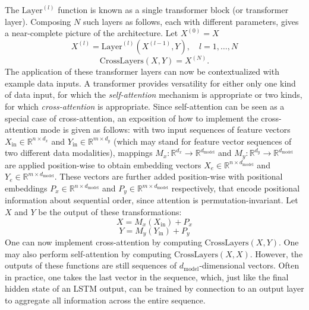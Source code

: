 \documentclass[stu,floatsintext]{apa7}
\begin{document}
The $\text{Layer}^{(l)}$ function is known as a single transformer block (or transformer layer). Composing $N$ such layers as follows, each with different parameters, gives a near-complete picture of the architecture. Let $X^{(0)}=X$
\begin{equation}X^{(l)} = \text{Layer}^{(l)}\left(X^{(l-1)}, Y\right), \quad l = 1, \dots, N\end{equation}
\begin{equation}\text{CrossLayers}(X,Y) = X^{(N)}.\end{equation}
The application of these transformer layers can now be contextualized with example data inputs. A transformer provides versatility for either only one kind of data input, for which the \textit{self-attention} mechanism is appropriate or two kinds, for which \textit{cross-attention} is appropriate. Since self-attention can be seen as a special case of cross-attention, an exposition of how to implement the cross-attention mode is given as follows: with two input sequences of feature vectors $X_{\text{in}}\in\mathbb R^{n\times d_x}$ and $Y_{\text{in}}\in\mathbb R^{m\times d_y}$ (which may stand for feature vector sequences of two different data modalities), mappings $M_x:\mathbb R^{d_x}\to\mathbb R^{d_{\text{model}}}$ and $M_y:\mathbb R^{d_y}\to\mathbb R^{d_{\text{model}}}$ are applied position-wise to obtain embedding vectors $X_e \in \mathbb{R}^{n\times d_{\text{model}}}$ and $Y_e\in\mathbb R^{m\times d_{\text{model}}}$. These vectors are further added position-wise with positional embeddings $P_x \in \mathbb{R}^{n\times d_{\text{model}}}$ and $P_y\in\mathbb R^{m\times d_{\text{model}}}$ respectively, that encode positional information about sequential order, since attention is permutation-invariant. Let $X$ and $Y$ be the output of these transformations:
\begin{equation}X=M_x(X_{\text{in}})+P_x\end{equation}
\begin{equation}Y=M_y(Y_{\text{in}})+P_y\end{equation}
One can now implement cross-attention by computing $\text{CrossLayers}(X,Y)$. One may also perform self-attention by computing $\text{CrossLayers}(X,X)$. However, the outputs of these functions are still sequences of $d_{\text{model}}$-dimensional vectors. Often in practice, one takes the last vector in the sequence, which, just like the final hidden state of an LSTM output, can be trained by connection to an output layer to aggregate all information across the entire sequence.
\end{document}
